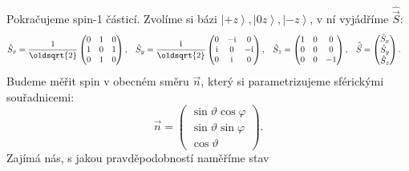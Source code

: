 \documentclass[10pt,a4paper]{article}
\newcommand{\const}[1]{\text{#1}}
\newcommand{\mat}[1]{
    \begin{pmatrix}
        #1
    \end{pmatrix}
}
\newcommand{\ket}[1]{\left| #1 \right>}
\renewcommand{\i}{\const{i}}
\begin{document}
Pokračujeme spin-1 částicí. Zvolíme si bázi $\ket{+z}, \ket{0z}, \ket{-z}$, v ní vyjádříme $\hat{\vec S}$:
\begin{align*}
    \hat S_x &= \frac{1}{\oldsqrt{2}} \mat{
        0 & 1 & 0 \\
        1 & 0 & 1 \\
        0 & 1 & 0
    },
    &
    \hat S_y &= \frac{1}{\oldsqrt{2}} \mat{
        0 & -\i & 0 \\
        \i & 0 & -\i \\
        0 & \i & 0
    },
    &
    \hat S_z &= \mat{
        1 & 0 & 0 \\
        0 & 0 & 0 \\
        0 & 0 & -1
    },
    &
    \hat{\vec S} &= \mat{
        \hat S_x \\
        \hat S_y \\
        \hat S_z
    }.
\end{align*}
Budeme měřit spin v obecném směru $\vec n$, který si parametrizujeme sférickými souřadnicemi:
\begin{equation*}
    \vec n = \mat{
        \sin \vartheta \cos \varphi \\
        \sin \vartheta \sin \varphi \\
        \cos \vartheta
    }.
\end{equation*}
Zajímá nás, s jakou pravděpodobností naměříme stav
\end{document}
